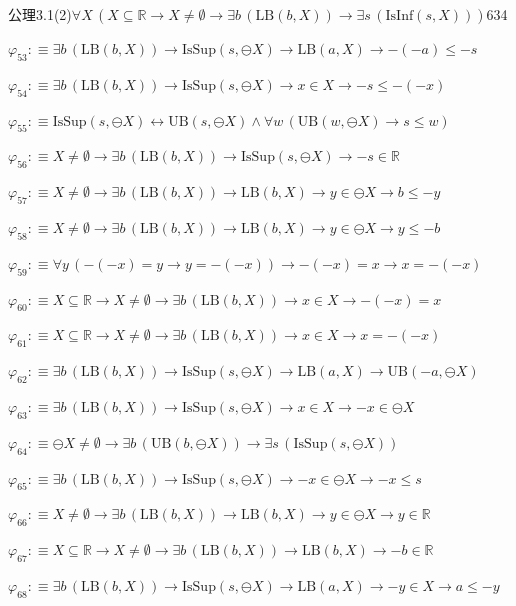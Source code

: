 \begin{fullproof}{公理3.1(2)}{$\forall X\,(X \subseteq \mathbb{R} \to X \neq \emptyset \to \exists b\,(\mathrm{LB}(b,X)) \to \exists s\,(\mathrm{IsInf}(s,X)))$}{634}
\begin{abbrevlist}
\item $\varphi_{53} :\equiv \exists b\,(\mathrm{LB}(b,X)) \to \mathrm{IsSup}(s,\ominus X) \to \mathrm{LB}(a,X) \to -(-a) \leq -s$
\item $\varphi_{54} :\equiv \exists b\,(\mathrm{LB}(b,X)) \to \mathrm{IsSup}(s,\ominus X) \to x \in X \to -s \leq -(-x)$
\item $\varphi_{55} :\equiv \mathrm{IsSup}(s,\ominus X) \leftrightarrow \mathrm{UB}(s,\ominus X) \land \forall w\,(\mathrm{UB}(w,\ominus X) \to s \leq w)$
\item $\varphi_{56} :\equiv X \neq \emptyset \to \exists b\,(\mathrm{LB}(b,X)) \to \mathrm{IsSup}(s,\ominus X) \to -s \in \mathbb{R}$
\item $\varphi_{57} :\equiv X \neq \emptyset \to \exists b\,(\mathrm{LB}(b,X)) \to \mathrm{LB}(b,X) \to y \in \ominus X \to b \leq -y$
\item $\varphi_{58} :\equiv X \neq \emptyset \to \exists b\,(\mathrm{LB}(b,X)) \to \mathrm{LB}(b,X) \to y \in \ominus X \to y \leq -b$
\item $\varphi_{59} :\equiv \forall y\,(-(-x) = y \to y = -(-x)) \to -(-x) = x \to x = -(-x)$
\item $\varphi_{60} :\equiv X \subseteq \mathbb{R} \to X \neq \emptyset \to \exists b\,(\mathrm{LB}(b,X)) \to x \in X \to -(-x) = x$
\item $\varphi_{61} :\equiv X \subseteq \mathbb{R} \to X \neq \emptyset \to \exists b\,(\mathrm{LB}(b,X)) \to x \in X \to x = -(-x)$
\item $\varphi_{62} :\equiv \exists b\,(\mathrm{LB}(b,X)) \to \mathrm{IsSup}(s,\ominus X) \to \mathrm{LB}(a,X) \to \mathrm{UB}(-a,\ominus X)$
\item $\varphi_{63} :\equiv \exists b\,(\mathrm{LB}(b,X)) \to \mathrm{IsSup}(s,\ominus X) \to x \in X \to -x \in \ominus X$
\item $\varphi_{64} :\equiv \ominus X \neq \emptyset \to \exists b\,(\mathrm{UB}(b,\ominus X)) \to \exists s\,(\mathrm{IsSup}(s,\ominus X))$
\item $\varphi_{65} :\equiv \exists b\,(\mathrm{LB}(b,X)) \to \mathrm{IsSup}(s,\ominus X) \to -x \in \ominus X \to -x \leq s$
\item $\varphi_{66} :\equiv X \neq \emptyset \to \exists b\,(\mathrm{LB}(b,X)) \to \mathrm{LB}(b,X) \to y \in \ominus X \to y \in \mathbb{R}$
\item $\varphi_{67} :\equiv X \subseteq \mathbb{R} \to X \neq \emptyset \to \exists b\,(\mathrm{LB}(b,X)) \to \mathrm{LB}(b,X) \to -b \in \mathbb{R}$
\item $\varphi_{68} :\equiv \exists b\,(\mathrm{LB}(b,X)) \to \mathrm{IsSup}(s,\ominus X) \to \mathrm{LB}(a,X) \to -y \in X \to a \leq -y$

\end{abbrevlist}
\end{fullproof}
